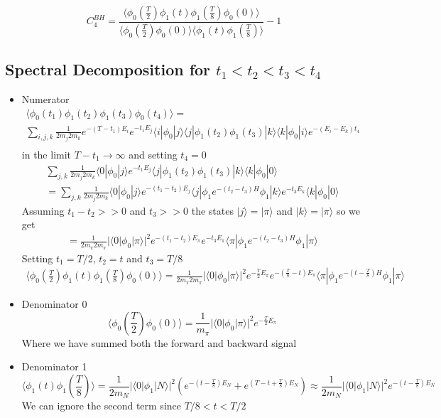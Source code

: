 \documentclass[10pt,a4paper]{article}
\begin{document}
$$C_4^{BH}=\frac{\langle \phi_0(\frac{T}{2})\phi_1(t)\phi_1(\frac{T}{8}) \phi_0(0)\rangle}
{\langle \phi_0(\frac{T}{2}) \phi_0(0)\rangle \langle \phi_1(t)\phi_1(\frac{T}{8}) \rangle} -1
$$

\subsection{Spectral Decomposition for $t_1<t_2<t_3<t_4$}

\begin{itemize}

\item Numerator
\begin{gather}
\langle \phi_0(t_1)\phi_1(t_2)\phi_1(t_3) \phi_0(t_4)\rangle=\\
 \sum_{i,j,k}\frac{1}{ 2 m_j 2 m_k}e^{-(T-t_1)E_i} e^{-t_1E_j}\langle i| \phi_0 | j\rangle\langle j|  \phi_1(t_2)\phi_1(t_3) 
 | k\rangle\langle k|  \phi_0 |i\rangle e^{-(E_i-E_k)t_4}\\
\end{gather}
in the limit $T-t_1\to \infty$ and setting $t_4=0$
\begin{gather}
 \sum_{j,k}\frac{1}{ 2 m_j 2 m_k}\langle 0| \phi_0 | j\rangle  e^{-t_1E_j} \langle j|   \phi_1(t_2)\phi_1(t_3) 
 | k\rangle  \langle k| \phi_0 | 0\rangle  \\
 = \sum_{j,k}\frac{1}{ 2 m_j 2 m_k}\langle 0| \phi_0 | j\rangle  e^{-(t_1-t_2)E_j} \langle j|   \phi_1 e^{-(t_2-t_3)H}\phi_1 
 | k\rangle  e^{- t_3 E_k} \langle k| \phi_0 | 0\rangle
\end{gather}
Assuming $t_1-t_2>>0$ and $t_3>>0$ the states $|j\rangle =| \pi\rangle$ and 
$|k\rangle =| \pi\rangle$ so we get
\begin{gather}
=\frac{1}{ 2 m_\pi 2 m_\pi}|\langle 0| \phi_0 | \pi\rangle|^2  e^{-(t_1-t_2)E_{\pi}}e^{- t_3 E_\pi}  \langle \pi|   \phi_1 e^{-(t_2-t_3)H}\phi_1 
 | \pi\rangle  
\end{gather}
Setting  $t_1=T/2$, $t_2=t$ and $t_3=T/8$
\begin{gather}
\langle \phi_0(\frac{T}{2})\phi_1(t)\phi_1(\frac{T}{8}) \phi_0(0)\rangle=
\frac{1}{ 2 m_\pi 2 m_\pi}|\langle 0| \phi_0 | \pi\rangle|^2  e^{-\frac{T}{2}E_{\pi}}e^{- (\frac{T}{8}-t) E_\pi}  \langle \pi|   \phi_1 e^{-(t-\frac{T}{8})H}\phi_1 
 | \pi\rangle  
\end{gather}

 \item Denominator 0
$$
\langle \phi_0(\frac{T}{2}) \phi_0(0)\rangle = \frac{1}{m_\pi}|\langle 0| \phi_0 | \pi\rangle|^2  e^{-\frac{T}{2}E_\pi}
$$
Where we have summed both the forward and backward signal

 \item Denominator 1
$$
\langle \phi_1(t) \phi_1(\frac{T}{8})\rangle = \frac{1}{2m_N}|\langle 0| \phi_1 | N\rangle|^2  \left(e^{- (t-\frac{T}{8})E_N}+  e^{(T-t+\frac{T}{8})E_N}  \right)
\approx\frac{1}{2m_N}|\langle 0| \phi_1 | N\rangle|^2  e^{- (t-\frac{T}{8})E_N}
$$
We can ignore the second term since $T/8<t<T/2$

\end{itemize}
\end{document}
